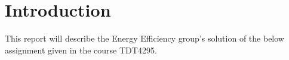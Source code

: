 \chapter{Introduction}\label{chapter:intro}

This report will describe the Energy Efficiency group's solution of the below assignment
given in the course TDT4295.



